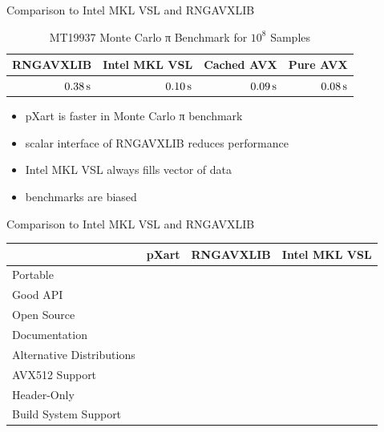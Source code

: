 \documentclass[aspectratio=169]{beamer}
\begin{document}
    \begin{frame}{Comparison to Intel MKL VSL and RNGAVXLIB}
      \begin{table}
        \caption{MT19937 Monte Carlo π Benchmark for $10^8$ Samples}
        \begin{tabular}{rrrr}
          \hline
          RNGAVXLIB & Intel MKL VSL & Cached AVX & Pure AVX \\
          \hline
          \hline
          $0.38\, \mathrm{s}$ & $0.10\, \mathrm{s}$ & $0.09\, \mathrm{s}$ & $0.08\, \mathrm{s}$ \\
          \hline
        \end{tabular}
      \end{table}
      \bigskip
      \begin{itemize}
        \pause
        \item pXart is faster in Monte Carlo π benchmark
        \pause
        \item scalar interface of RNGAVXLIB reduces performance
        \pause
        \item Intel MKL VSL always fills vector of data
        \pause
        \item benchmarks are biased
      \end{itemize}
    \end{frame}

    \begin{frame}{Comparison to Intel MKL VSL and RNGAVXLIB}
      \renewcommand{\checkmark}{\textcolor{cgreen}{\ding{52}}}
      \newcommand{\crossmark}{\textcolor{cred}{\ding{56}}}
      \begin{table}
        \begin{tabular}{lccc}
          \hline
          & pXart & RNGAVXLIB & Intel MKL VSL \\
          \hline
          \hline
          \rowcolor{bgc}
          Portable & \checkmark & \crossmark & \checkmark \\
          Good API & \checkmark & \crossmark & \crossmark \\
          \rowcolor{bgc}
          Open Source & \checkmark & \checkmark & \crossmark \\
          Documentation & \checkmark & \crossmark & \checkmark \\
          \rowcolor{bgc}
          Alternative Distributions & \crossmark & \checkmark & \checkmark \\
          AVX512 Support & \crossmark & \crossmark & \checkmark \\
          \hline
          \hline
          \rowcolor{bgc}
          Header-Only & \checkmark & \crossmark & \crossmark \\
          Build System Support & \checkmark & \crossmark & \crossmark \\
          \hline
        \end{tabular}
      \end{table}
    \end{frame}
\end{document}
